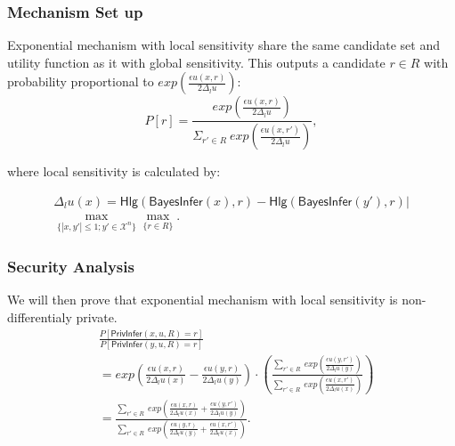 \documentclass{article}
\begin{document}
\subsubsection{Mechanism Set up}
Exponential mechanism with local sensitivity share the same candidate set and utility function as it with global sensitivity. This outputs a candidate $r \in R$ with probability proportional to $exp(\frac{\epsilon u(x,r)}{2 \Delta_{l}u})$:
\begin{equation*}
P[r] = \frac
{exp(\frac{\epsilon u(x,r)}{2 \Delta_{l}u})}
{\Sigma_{r' \in R}\ exp(\frac{\epsilon u(x,r')}{2 \Delta_{l}u})},
\end{equation*}

where local sensitivity is calculated by:

\begin{multline*}
\Delta_{l}u(x) = 
\mathsf{Hlg}(\mathsf{BayesInfer}(x), r) - \mathsf{Hlg}(\mathsf{BayesInfer}(y'), r)|\\
\max_{\{|x,y'| \leq 1;y'\in \mathcal{X}^n\}}\max_{\{r\in R\}}.
\end{multline*}

\subsubsection{Security Analysis}
We will then prove that exponential mechanism with local sensitivity is non-differentialy private.
\begin{equation*}
\begin{split}
& \frac{P[\mathsf{PrivInfer}(x,u,R) = r]}{P[\mathsf{PrivInfer}(y,u,R) = r]} \\
& = exp\left(
\frac{\epsilon u(x,r)}{2 \Delta_{l}u(x)} - 
\frac{\epsilon u(y,r)}{2 \Delta_{l}u(y)}
\right)  \cdot
\left(\frac
{\sum\limits_{r' \in R}\ exp(\frac{\epsilon u(y,r')}{2 \Delta_{l}u(y)})}
{\sum\limits_{r' \in R}\ exp(\frac{\epsilon u(x,r')}{2 \Delta_{l}u(x)})}
\right) \\
& = \frac
{\sum\limits_{r' \in R}\ exp(\frac{\epsilon u(x,r)}{2 \Delta_{l}u(x)} 
+ \frac{\epsilon u(y,r')}{2 \Delta_{l}u(y)})}
{\sum\limits_{r' \in R}\ exp(\frac{\epsilon u(y,r)}{2 \Delta_{l}u(y)} 
+ \frac{\epsilon u(x,r')}{2 \Delta_{l}u(x)})}.
\end{split}
\end{equation*}
\end{document}
